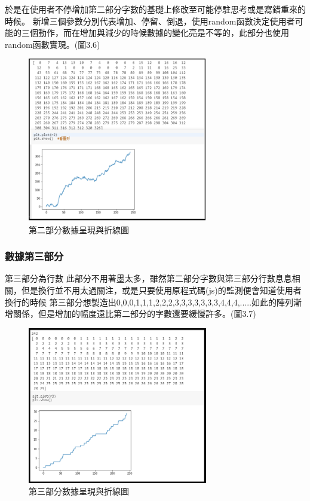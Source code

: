 於是在使用者不停增加第二部分字數的基礎上修改至可能停駐思考或是寫錯重來的時候。
新增三個參數分別代表增加、停留、倒退，使用random函數決定使用者可能的三個動作，而在增加與減少的時候數據的變化亮是不等的，此部分也使用random函數實現。(圖3.6)
\begin{figure}[H] %
	\centering %
	\includegraphics[width=0.7\textwidth]{3_2_1_4.png} %
	\caption{第二部分數據呈現與折線圖} %
	\label{Fig.3.6} %
\end{figure}
\subsubsection{數據第三部分}
第三部分為行數 此部分不用著墨太多，雖然第二部分字數與第三部分行數息息相關，但是換行並不用太過關注，或是只要使用原程式碼(js)的監測便會知道使用者換行的時候
第三部分想製造出0,0,0,1,1,1,2,2,2,3,3,3,3,3,3,3,4,4,4,.....如此的陣列漸增關係，但是增加的幅度遠比第二部分的字數還要緩慢許多。(圖3.7)
	\begin{figure}[H] %
	\centering %
	\includegraphics[width=0.7\textwidth]{3_2_1_5.png} %
	\caption{第三部分數據呈現與折線圖} %
	\label{Fig.3.7} %
	\end{figure}
